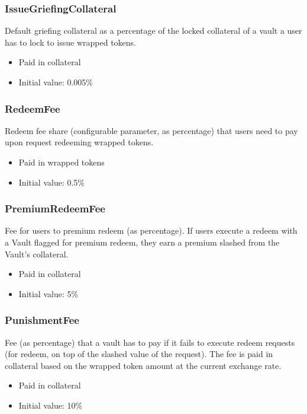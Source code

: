 \documentclass[a4paper,10pt,english]{sphinxmanual}
\begin{document}
\subsubsection{IssueGriefingCollateral}
\label{\detokenize{spec/fee:issuegriefingcollateral}}
Default griefing collateral as a percentage of the locked collateral of a vault a user has to lock to issue wrapped tokens.
\begin{itemize}
\item {} 
Paid in collateral

\item {} 
Initial value: 0.005\%

\end{itemize}


\subsubsection{RedeemFee}
\label{\detokenize{spec/fee:redeemfee}}\label{\detokenize{spec/fee:id1}}
Redeem fee share (configurable parameter, as percentage) that users need to pay upon request redeeming wrapped tokens.
\begin{itemize}
\item {} 
Paid in wrapped tokens

\item {} 
Initial value: 0.5\%

\end{itemize}


\subsubsection{PremiumRedeemFee}
\label{\detokenize{spec/fee:premiumredeemfee}}\label{\detokenize{spec/fee:id2}}
Fee for users to premium redeem (as percentage). If users execute a redeem with a Vault flagged for premium redeem, they earn a premium slashed from the Vault’s collateral.
\begin{itemize}
\item {} 
Paid in collateral

\item {} 
Initial value: 5\%

\end{itemize}


\subsubsection{PunishmentFee}
\label{\detokenize{spec/fee:punishmentfee}}\label{\detokenize{spec/fee:id3}}
Fee (as percentage) that a vault has to pay if it fails to execute redeem requests (for redeem, on top of the slashed value of the request). The fee is paid in collateral based on the wrapped token amount at the current exchange rate.
\begin{itemize}
\item {} 
Paid in collateral

\item {} 
Initial value: 10\%

\end{itemize}
\end{document}
